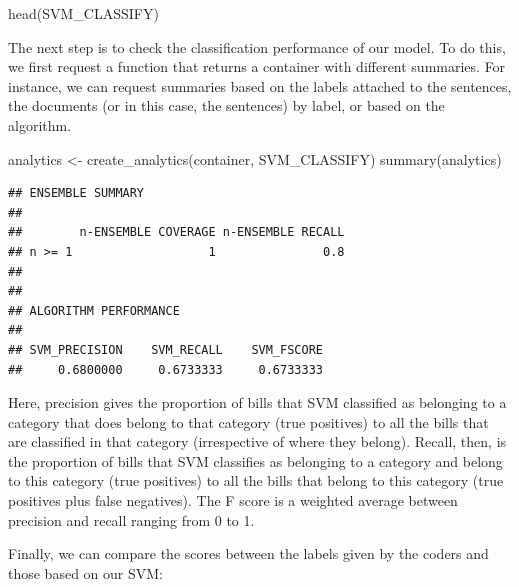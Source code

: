 \documentclass[
]{article}
\newenvironment{Shaded}{\begin{snugshade}}{\end{snugshade}}
\newcommand{\DecValTok}[1]{\textcolor[rgb]{0.00,0.00,0.81}{#1}}
\newcommand{\FunctionTok}[1]{\textcolor[rgb]{0.00,0.00,0.00}{#1}}
\newcommand{\NormalTok}[1]{#1}
\newcommand{\OtherTok}[1]{\textcolor[rgb]{0.56,0.35,0.01}{#1}}
\newcommand{\SpecialCharTok}[1]{\textcolor[rgb]{0.00,0.00,0.00}{#1}}
\begin{document}
\begin{Shaded}
\begin{Highlighting}[]
\FunctionTok{head}\NormalTok{(SVM\_CLASSIFY)}
\end{Highlighting}
\end{Shaded}

The next step is to check the classification performance of our model. To do this, we first request a function that returns a container with different summaries. For instance, we can request summaries based on the labels attached to the sentences, the documents (or in this case, the sentences) by label, or based on the algorithm.

\begin{Shaded}
\begin{Highlighting}[]
\NormalTok{analytics }\OtherTok{\textless{}{-}} \FunctionTok{create\_analytics}\NormalTok{(container, SVM\_CLASSIFY)}
\FunctionTok{summary}\NormalTok{(analytics)}
\end{Highlighting}
\end{Shaded}

\begin{verbatim}
## ENSEMBLE SUMMARY
## 
##        n-ENSEMBLE COVERAGE n-ENSEMBLE RECALL
## n >= 1                   1               0.8
## 
## 
## ALGORITHM PERFORMANCE
## 
## SVM_PRECISION    SVM_RECALL    SVM_FSCORE 
##     0.6800000     0.6733333     0.6733333
\end{verbatim}

Here, precision gives the proportion of bills that SVM classified as belonging to a category that does belong to that category (true positives) to all the bills that are classified in that category (irrespective of where they belong). Recall, then, is the proportion of bills that SVM classifies as belonging to a category and belong to this category (true positives) to all the bills that belong to this category (true positives plus false negatives). The F score is a weighted average between precision and recall ranging from 0 to 1.

Finally, we can compare the scores between the labels given by the coders and those based on our SVM:

\begin{Shaded}
\end{Shaded}
\end{document}
